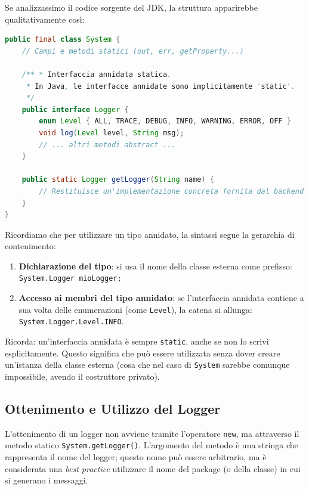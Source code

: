 \medskip

Se analizzassimo il codice sorgente del JDK, la struttura apparirebbe qualitativamente così:

\begin{lstlisting}[language=Java, caption={Struttura semplificata di System.java}]
public final class System {
    // Campi e metodi statici (out, err, getProperty...)
    
    /** * Interfaccia annidata statica. 
     * In Java, le interfacce annidate sono implicitamente 'static'.
     */
    public interface Logger {
        enum Level { ALL, TRACE, DEBUG, INFO, WARNING, ERROR, OFF }
        void log(Level level, String msg);
        // ... altri metodi abstract ...
    }

    public static Logger getLogger(String name) {
        // Restituisce un'implementazione concreta fornita dal backend
    }
}
\end{lstlisting}


Ricordiamo che per utilizzare un tipo annidato, la sintassi segue la gerarchia di contenimento:

\begin{enumerate}
    \item \textbf{Dichiarazione del tipo}: si usa il nome della classe esterna come prefisso:\\ \texttt{System.Logger mioLogger;}
    \item \textbf{Accesso ai membri del tipo annidato}: se l'interfaccia annidata contiene a sua volta delle enumerazioni (come \texttt{Level}), la catena si allunga:\\ \texttt{System.Logger.Level.INFO}.
\end{enumerate}


\begin{tip}
Ricorda: un'interfaccia annidata è sempre \texttt{static}, anche se non lo scrivi esplicitamente. Questo significa che può essere utilizzata senza dover creare un'istanza della classe esterna (cosa che nel caso di \texttt{System} sarebbe comunque impossibile, avendo il costruttore privato).
\end{tip}

\subsection{Ottenimento e Utilizzo del Logger}

L'ottenimento di un logger non avviene tramite l'operatore \texttt{new}, ma attraverso il metodo statico \texttt{System.getLogger()}. L'argomento del metodo è una stringa che rappresenta il nome del logger; questo nome può essere arbitrario, ma è considerata una \textit{best practice} utilizzare il nome del package (o della classe) in cui si generano i messaggi. 

